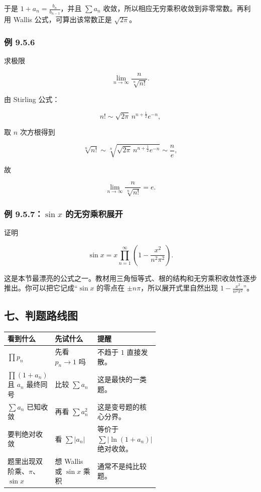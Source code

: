 于是 \(1+a_n=\frac{b_n}{b_{n-1}}\)，并且 \(\sum a_n\) 收敛，所以相应无穷乘积收敛到非零常数。再利用 Wallis 公式，可算出该常数正是 \(\sqrt{2\pi}\)。

\subsubsection*{例 9.5.6}

求极限

\[
      \lim_{n\to\infty}\frac{n}{\sqrt[n]{n!}}.
    \]

由 Stirling 公式：

\[
      n!\sim \sqrt{2\pi}\,n^{n+\frac12}e^{-n},
    \]

取 \(n\) 次方根得到

\[
      \sqrt[n]{n!}\sim \sqrt[n]{\sqrt{2\pi}\,n^{n+\frac12}e^{-n}}\sim \frac{n}{e},
    \]

故

\[
      \lim_{n\to\infty}\frac{n}{\sqrt[n]{n!}}=e.
    \]

\subsubsection*{例 9.5.7：\(\sin x\) 的无穷乘积展开}

证明

\[
      \sin x=x\prod_{n=1}^{\infty}\left(1-\frac{x^2}{n^2\pi^2}\right).
    \]

这是本节最漂亮的公式之一。教材用三角恒等式、根的结构和无穷乘积收敛性逐步推出。你可以把它记成“\(\sin x\) 的零点在 \(\pm n\pi\)，所以展开式里自然出现 \(1-\frac{x^2}{n^2\pi^2}\)”。

\subsection*{七、判题路线图}

\begin{center}
\small
\begin{tabularx}{\linewidth}{|>{\raggedright\arraybackslash}p{0.18\linewidth}|>{\raggedright\arraybackslash}p{0.42\linewidth}|>{\raggedright\arraybackslash}X|}
\hline
\textbf{看到什么} & \textbf{先试什么} & \textbf{提醒} \\ \hline
\(\prod p_n\) & 先看 \(p_n\to1\) 吗 & 不趋于 \(1\) 直接发散。 \\ \hline
\(\prod(1+a_n)\) 且 \(a_n\) 最终同号 & 比较 \(\sum a_n\) & 这是最快的一类题。 \\ \hline
\(\sum a_n\) 已知收敛 & 再看 \(\sum a_n^2\) & 这是变号题的核心分界。 \\ \hline
要判绝对收敛 & 看 \(\sum |a_n|\) & 等价于 \(\sum |\ln(1+a_n)|\) 绝对收敛。 \\ \hline
题里出现双阶乘、\(\pi\)、\(\sin x\) & 想 Wallis 或 \(\sin x\) 乘积 & 通常不是纯比较题。 \\ \hline
\end{tabularx}
\end{center}

